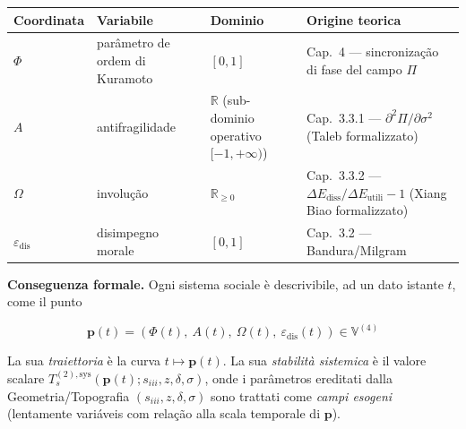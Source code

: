 {\def\LTcaptype{none} %
{\small\begin{longtable}[]{@{}
  >{\raggedright\arraybackslash}p{}
  >{\raggedright\arraybackslash}p{}
  >{\raggedright\arraybackslash}p{}
  >{\raggedright\arraybackslash}p{}@{}}
\toprule\noalign{}
\begin{minipage}[b]{\linewidth}\raggedright
Coordinata
\end{minipage} & \begin{minipage}[b]{\linewidth}\raggedright
Variabile
\end{minipage} & \begin{minipage}[b]{\linewidth}\raggedright
Dominio
\end{minipage} & \begin{minipage}[b]{\linewidth}\raggedright
Origine teorica
\end{minipage} \\
\midrule\noalign{}
\endhead
\bottomrule\noalign{}
\endlastfoot
\(\Phi\) & parâmetro de ordem di Kuramoto & \([0, 1]\) & Cap.~4 ---
sincronização di fase del campo \(\Pi\) \\
\(A\) & antifragilidade & \(\mathbb{R}\) (sub-dominio operativo
\([-1, +\infty)\)) & Cap.~3.3.1 --- \(\partial^2\Pi/\partial\sigma^2\)
(Taleb formalizzato) \\
\(\Omega\) & involução & \(\mathbb{R}_{\geq 0}\) & Cap.~3.3.2 ---
\(\Delta E_{\text{diss}}/\Delta E_{\text{utili}} - 1\) (Xiang Biao
formalizzato) \\
\(\varepsilon_{\text{dis}}\) & disimpegno morale & \([0, 1]\) & Cap.~3.2
--- Bandura/Milgram \\
\end{longtable}}
}

\Proved{} \textbf{Conseguenza formale.} Ogni sistema sociale è
descrivibile, ad un dato istante \(t\), come il punto

\[
\boldsymbol{p}(t) = (\Phi(t),\ A(t),\ \Omega(t),\ \varepsilon_{\text{dis}}(t)) \in \mathbb{V}^{(4)}
\]

La sua \emph{traiettoria} è la curva \(t \mapsto \boldsymbol{p}(t)\). La
sua \emph{stabilità sistemica} è il valore scalare
\(T_s^{(2),\text{sys}}(\boldsymbol{p}(t); s_{iii}, z, \delta, \sigma)\),
onde i parâmetros ereditati dalla Geometria/Topografia
\((s_{iii}, z, \delta, \sigma)\) sono trattati come \emph{campi esogeni}
(lentamente variáveis com relação alla scala temporale di
\(\boldsymbol{p}\)).

